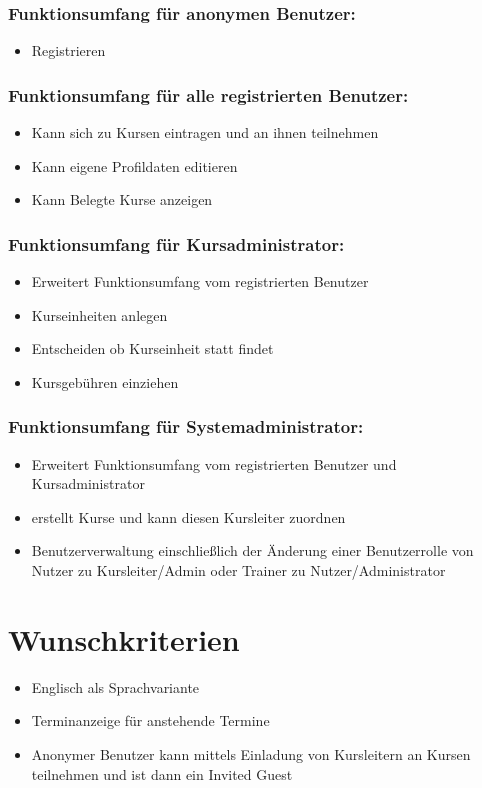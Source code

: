 \documentclass[a4paper]{scrreprt}
\begin{document}
     	\subsubsection{Funktionsumfang für anonymen Benutzer:}
       		\begin{itemize}
	       		\item Registrieren
       		\end{itemize}
     	\subsubsection{Funktionsumfang für alle registrierten Benutzer:}
			\begin{itemize}
				\item Kann sich zu Kursen eintragen und an ihnen teilnehmen
				\item Kann eigene Profildaten editieren
				\item Kann Belegte Kurse anzeigen
			\end{itemize}
		\subsubsection{Funktionsumfang für Kursadministrator:}
			\begin{itemize}
				\item Erweitert Funktionsumfang vom \glqq registrierten Benutzer\grqq
				\item Kurseinheiten anlegen
				\item Entscheiden ob Kurseinheit statt findet
				\item Kursgebühren einziehen
			\end{itemize}
		\subsubsection{Funktionsumfang für Systemadministrator:}
			\begin{itemize}
				\item Erweitert Funktionsumfang vom \glqq registrierten Benutzer\grqq{} und \glqq Kursadministrator\grqq
				\item erstellt Kurse und kann diesen Kursleiter zuordnen
				\item Benutzerverwaltung einschließlich der Änderung einer Benutzerrolle von Nutzer zu Kursleiter/\gls{Admin} oder \gls{Trainer} zu Nutzer/Administrator
			\end{itemize}
			
    \section{Wunschkriterien}
			\begin{itemize}
				\item Englisch als Sprachvariante
				\item Terminanzeige für anstehende Termine
	       		\item Anonymer Benutzer kann mittels Einladung von Kursleitern an Kursen teilnehmen und ist dann ein \glqq Invited Guest\grqq{}
			\end{itemize}
			
\end{document}
